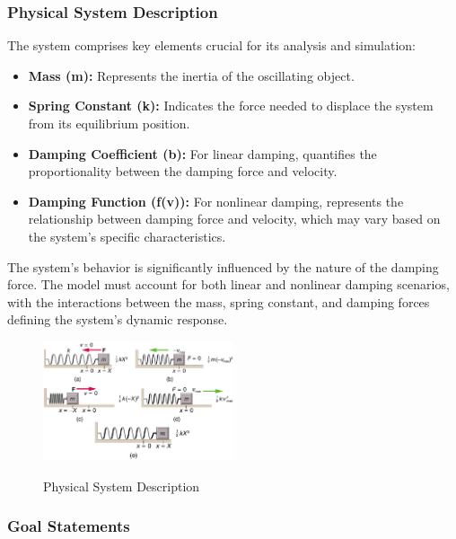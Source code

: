 \documentclass[12pt]{article}
\begin{document}
\subsubsection{Physical System Description} \label{sec_phySystDescrip}

The system comprises key elements crucial for its analysis and simulation:
\begin{itemize}
  \item \textbf{Mass (m):} Represents the inertia of the oscillating object.
  \item \textbf{Spring Constant (k):} Indicates the force needed to displace the 
  system from its equilibrium position.
  \item \textbf{Damping Coefficient (b):} For linear damping, quantifies the 
  proportionality between the damping force and velocity.
  \item \textbf{Damping Function (f(v)):} For nonlinear damping, represents the 
  relationship between damping force and velocity, which may vary based on the 
  system's specific characteristics.
\end{itemize}
 
 
The system's behavior is significantly influenced by the nature of the damping 
force. The model must account for both linear and nonlinear damping scenarios, 
with the interactions between the mass, spring constant, and damping forces 
defining the system's dynamic response.


\begin{figure}[h!]
\begin{center}
{
 \includegraphics[width=0.5\textwidth]{./physical_system_description.jpg}
}
\caption{Physical System Description}
\end{center}
\end{figure}

\subsubsection{Goal Statements}
\end{document}
